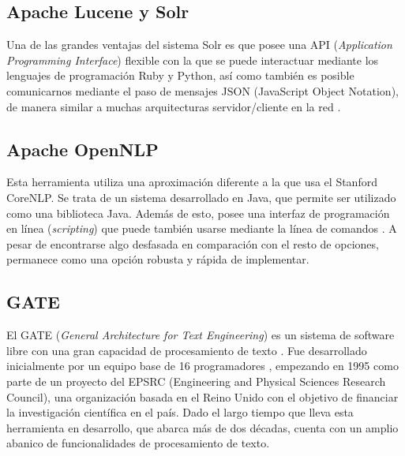 \subsection{Apache Lucene y Solr}

Una de las grandes ventajas del sistema Solr es que posee una API (\textit{Application Programming Interface}) flexible con la que se puede interactuar mediante los lenguajes de programación Ruby y Python, así como también es posible comunicarnos mediante el paso de mensajes JSON (JavaScript Object Notation), de manera similar a muchas arquitecturas servidor/cliente en la red \cite{apache-lucene}.

\subsection{Apache OpenNLP}

Esta herramienta utiliza una aproximación diferente a la que usa el Stanford CoreNLP.
%
Se trata de un sistema desarrollado en Java, que permite ser utilizado como una biblioteca Java. Además de esto, posee una interfaz de programación en línea (\textit{scripting}) que puede también usarse mediante la línea de comandos \cite{apache-open-nlp}.
%
A pesar de encontrarse algo desfasada en comparación con el resto de opciones, permanece como una opción robusta y rápida de implementar.




\subsection{GATE}

El GATE (\textit{General Architecture for Text Engineering}) es un sistema de software libre con una gran capacidad de procesamiento de texto \cite{gate}.
%
Fue desarrollado inicialmente por un equipo base de 16 programadores \cite{gate-about}, empezando en 1995 como parte de un proyecto del EPSRC (Engineering and Physical Sciences Research Council), una organización basada en el Reino Unido con el objetivo de financiar la investigación científica en el país.
%
Dado el largo tiempo que lleva esta herramienta en desarrollo, que abarca más de dos décadas, cuenta con un amplio abanico de funcionalidades de procesamiento de texto.

